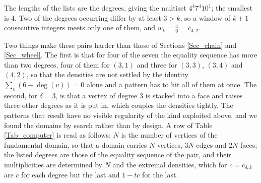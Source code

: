 \documentclass[12pt,a4paper]{article}%
\begin{document}
\noindent The lengths of the lists are the degrees, giving the multiset $4^{4}7^{4}10^{1}$; the smallest is $4$. Two of the
degrees occurring differ by at least $3>k$, so a window of $k+1$ consecutive integers meets only one of
them, and $w_{k}=\tfrac{4}{9}=c_{4,2}$.


Two things make these pairs harder than those of Sections \ref{Sec_chain} and \ref{Sec_wheel}. The
first is that for four of the seven the equality sequence has more than two degrees, four of them for
$(3,1)$ and three for $(3,3)$, $(3,4)$ and $(4,2)$, so that the densities are not settled by the
identity $\sum_{v}(6-\deg (v))=0$ alone and a pattern has to hit all of them at once. The second,
for $\delta =3$, is that a vertex of degree $3$ is stacked into a face and raises three other degrees
as it is put in, which couples the densities tightly. The patterns that result have no visible
regularity of the kind exploited above, and we found the domains by search rather than by design. A
row of Table
\ref{Tab_computer} is read as follows: $N$ is the number of vertices of the fundamental domain, so
that a domain carries $N$ vertices, $3N$ edges and $2N$ faces; the listed degrees are those of the
equality sequence of the pair, and their multiplicities are determined by $N$ and the extremal
densities, which for $c=c_{\delta ,k}$ are $c$ for each degree but the last and $1-tc$ for the last.
\end{document}
